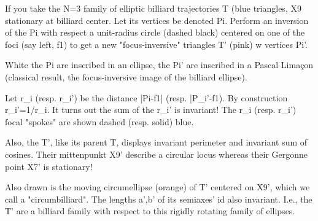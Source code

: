 If you take the N=3 family of elliptic billiard trajectories T (blue triangles, X9 stationary at billiard center. Let its vertices be denoted Pi. Perform an inversion of the Pi with respect a unit-radius circle (dashed black) centered on one of the foci (say left, f1) to get a new "focus-inversive" triangles T' (pink) w vertices Pi'. 

White the Pi are inscribed in an ellipse, the Pi' are inscribed in a Pascal Limaçon (classical result, the focus-inversive image of the billiard ellipse).

Let r_i (resp. r_i') be the distance |Pi-f1| (resp. |P_i'-f1). By construction r_i'=1/r_i. It turns out the sum of the r_i' is invariant! The r_i (resp. r_i') focal "spokes" are shown dashed (resp. solid) blue.

Also, the T', like its parent T, displays invariant perimeter and invariant sum of cosines. Their mittenpunkt X9' describe a circular locus whereas their Gergonne point X7' is stationary!

Also drawn is the moving circumellipse (orange) of T' centered on X9', which we call a "circumbilliard". The lengths a',b' of its semiaxes' id also invariant. I.e., the T' are a billiard family with respect to this rigidly rotating family of ellipses.